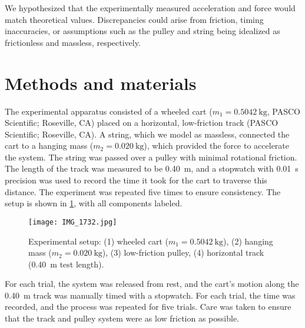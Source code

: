 \documentclass[reprint,amsmath,amssymb,aps]{revtex4-2}
\begin{document}
We hypothesized that the experimentally measured acceleration and force would match theoretical values. Discrepancies could arise from friction, timing inaccuracies, or assumptions such as the pulley and string being idealized as frictionless and massless, respectively.







\section{Methods and materials}
The experimental apparatus consisted of a wheeled cart ($m_1 = \qty{0.5042}{\kilo\gram}$, PASCO Scientific; Roseville, CA) placed on a horizontal, low-friction track (PASCO Scientific; Roseville, CA). A string, which we model as massless, connected the cart to a hanging mass ($m_2 = \qty{0.020}{\kilo\gram}$), which provided the force to accelerate the system. The string was passed over a pulley with minimal rotational friction. The length of the track was measured to be \qty{0.40}{\meter}, and a stopwatch with \qty{0.01}{\second} precision was used to record the time it took for the cart to traverse this distance. The experiment was repeated five times to ensure consistency. The setup is shown in \cref{fig:1}, with all components labeled.
\begin{figure}
\begin{center}
\texttt{[image: IMG\_1732.jpg]}
\end{center}
\caption{\label{fig:1} Experimental setup: (1) wheeled cart ($m_1=\qty{0.5042}{\kilo\gram}$), (2) hanging mass ($m_2=\qty{0.020}{\kilo\gram}$), (3) low-friction pulley, (4) horizontal track (\qty{0.40}{\meter} test length).}
\end{figure}

For each trial, the system was released from rest, and the cart’s motion along the \qty{0.40}{\meter} track was manually timed with a stopwatch. For each trial, the time was recorded, and the process was repeated for five trials. Care was taken to ensure that the track and pulley system were as low friction as possible.
\end{document}
